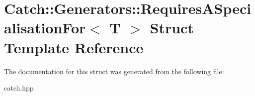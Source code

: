 \hypertarget{structCatch_1_1Generators_1_1RequiresASpecialisationFor}{}\section{Catch\+:\+:Generators\+:\+:Requires\+A\+Specialisation\+For$<$ T $>$ Struct Template Reference}
\label{structCatch_1_1Generators_1_1RequiresASpecialisationFor}


The documentation for this struct was generated from the following file\+:\begin{DoxyCompactItemize}
\item 
catch.\+hpp\end{DoxyCompactItemize}
